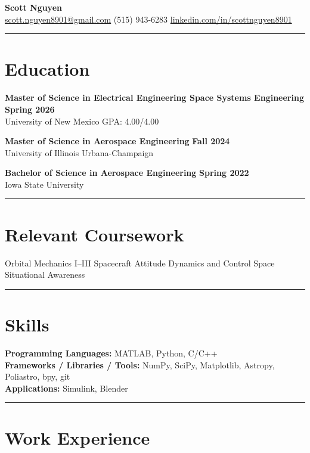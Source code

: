 \documentclass[10pt]{article}
\newcommand{\sectionline}{\noindent\rule{\linewidth}{0.4pt}}
\begin{document}
	
	\begin{center}
		{\color{mygreen}
			{\Huge \textbf{Scott Nguyen}} \\
			\href{mailto:scott.nguyen8901@gmail.com}{scott.nguyen8901@gmail.com} \quad \textbar \quad 
			(515) 943-6283 \quad \textbar \quad 
			\href{https://www.linkedin.com/in/scottnguyen8901/}{linkedin.com/in/scottnguyen8901}
		}
	\end{center}
	
	\sectionline
	
	\section*{Education}
	
	\textbf{Master of Science in Electrical Engineering \textbar Space Systems Engineering} \hfill \textbf{Spring 2026} \\
	University of New Mexico \hfill GPA: 4.00/4.00
	
	\textbf{Master of Science in Aerospace Engineering} \hfill \textbf{Fall 2024} \\
	University of Illinois Urbana-Champaign
	
	\textbf{Bachelor of Science in Aerospace Engineering} \hfill \textbf{Spring 2022} \\
	Iowa State University
	
	\sectionline
	
	\section*{Relevant Coursework}
	Orbital Mechanics I–III \hfill
	Spacecraft Attitude Dynamics and Control \hfill
	Space Situational Awareness
	
	\sectionline
	
	\section*{Skills}
	\textbf{Programming Languages:} MATLAB, Python, C/C++ \\
	\textbf{Frameworks / Libraries / Tools:} NumPy, SciPy, Matplotlib, Astropy, Poliastro, bpy, git \\
	\textbf{Applications:} Simulink, Blender
	
	\sectionline
	
	\section*{Work Experience}
	
\end{document}
